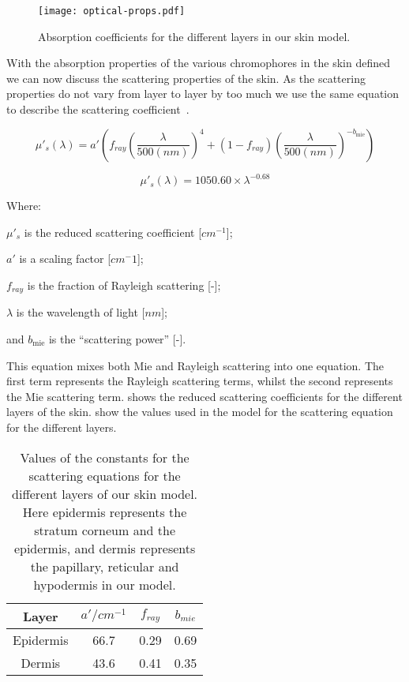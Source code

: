 \begin{figure}[!htpb]
  \centering
  \texttt{[image: optical-props.pdf]}
  \caption{Absorption coefficients for the different layers in our skin model.}
  \label{fig:absoplayers}
\end{figure}


With the absorption properties of the various chromophores in the skin defined we can now discuss the scattering properties of the skin.
As the scattering properties do not vary from layer to layer by too much we use the same equation to describe the scattering coefficient~\cite{jacques2013optical,iglesias2015biophysically,louisethesis}.

\begin{equation}
\mu'_s(\lambda)=a'\left(f_{ray}\left(\frac{\lambda}{500(nm)}\right)^4+(1-f_{ray})\left(\frac{\lambda}{500(nm)}\right)^{-b_{\text{mie}}}\right)
\label{eqn:scattrest}
\end{equation}

\begin{equation}
\mu'_s(\lambda)=1050.60\times\lambda^{-0.68}
\label{eqn:hyposcat}
\end{equation}


\noindent Where:

	$\mu'_s$ is the reduced scattering coefficient [$cm^{-1}$];

	$a'$ is a scaling factor [$cm^-1$];

	$f_{ray}$ is the fraction of Rayleigh scattering [-];

	$\lambda$ is the wavelength of light [$nm$];

	and $b_{\text{mie}}$ is the ``scattering power'' [-].

\medskip

This equation mixes both Mie and Rayleigh scattering into one equation.
The first term represents the Rayleigh scattering terms, whilst the second represents the Mie scattering term.
 shows the reduced scattering coefficients for the different layers of the skin.
 show the values used in the model for the scattering equation for the different layers.

\begin{table}[!htpb]
  \centering

  \begin{tabular}{|c|c|c|c|}
  \hline

  Layer & $a'/cm^{-1}$ & $f_{ray}$ & $b_{mie}$ \\
  \hline
   Epidermis         & 66.7 & 0.29 & 0.69 \\
   Dermis  & 43.6 & 0.41 & 0.35 \\

  \hline
  \end{tabular}
  \caption{Values of the constants for the scattering equations for the different layers of our skin model. Here epidermis represents the stratum corneum and the epidermis, and dermis represents the papillary, reticular and hypodermis in our model.}
  \label{tab:valscat}

\end{table}

